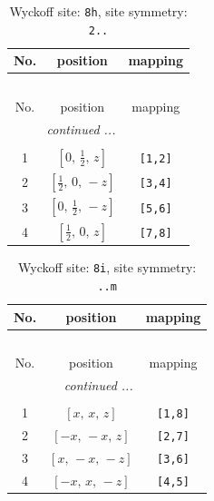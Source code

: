 \documentclass[fleqn,8pt]{jsarticle}
\begin{document}
\renewcommand{\arraystretch}{1.2}
\begin{longtable}{ccc}
\caption{Wyckoff site: {\tt 8h}, site symmetry: {\tt 2..}}
 \\
 \hline \hline
No. & position & mapping \\ \hline \endfirsthead

\multicolumn{2}{l}{\tablename\ \thetable{}} \\
 \hline \hline
No. & position & mapping \\ \hline \endhead

 \hline \hline
\multicolumn{2}{r}{\footnotesize\it continued ...} \\ \endfoot

 \hline \hline
\multicolumn{2}{r}{} \\ \endlastfoot

1 & $\left[ 0,\, \frac{1}{2},\, z \right]$ & {\tt [1,2]} \\ \hline
2 & $\left[ \frac{1}{2},\, 0,\, - z \right]$ & {\tt [3,4]} \\ \hline
3 & $\left[ 0,\, \frac{1}{2},\, - z \right]$ & {\tt [5,6]} \\ \hline
4 & $\left[ \frac{1}{2},\, 0,\, z \right]$ & {\tt [7,8]} \\
\end{longtable}
\renewcommand{\arraystretch}{1.2}
\begin{longtable}{ccc}
\caption{Wyckoff site: {\tt 8i}, site symmetry: {\tt ..m}}
 \\
 \hline \hline
No. & position & mapping \\ \hline \endfirsthead

\multicolumn{2}{l}{\tablename\ \thetable{}} \\
 \hline \hline
No. & position & mapping \\ \hline \endhead

 \hline \hline
\multicolumn{2}{r}{\footnotesize\it continued ...} \\ \endfoot

 \hline \hline
\multicolumn{2}{r}{} \\ \endlastfoot

1 & $\left[ x,\, x,\, z \right]$ & {\tt [1,8]} \\ \hline
2 & $\left[ - x,\, - x,\, z \right]$ & {\tt [2,7]} \\ \hline
3 & $\left[ x,\, - x,\, - z \right]$ & {\tt [3,6]} \\ \hline
4 & $\left[ - x,\, x,\, - z \right]$ & {\tt [4,5]} \\
\end{longtable}
\end{document}
